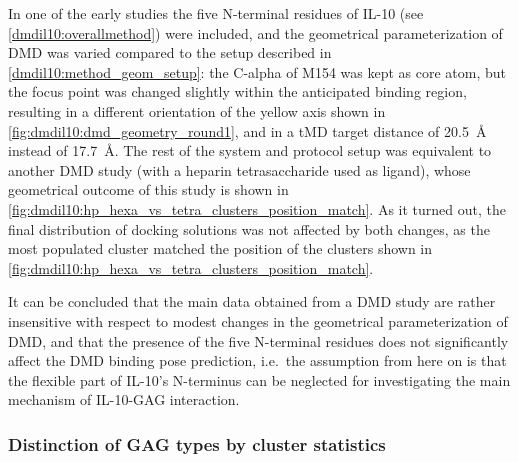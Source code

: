 In one of the early studies the five N-terminal residues of IL-10 (see
\ref{dmdil10:overallmethod}) were included, and the geometrical parameterization
of DMD was varied compared to the setup described in
\ref{dmdil10:method_geom_setup}: the C-alpha of M154 was kept as core atom, but
the focus point was changed slightly within the anticipated binding region,
resulting in a different orientation of the yellow axis shown in
\cref{fig:dmdil10:dmd_geometry_round1}, and in a tMD target distance of
\SI{20.5}{\angstrom} instead of \SI{17.7}{\angstrom}. The rest of the system and
protocol setup was equivalent to another DMD study (with a heparin
tetrasaccharide used as ligand), whose geometrical outcome of this study is
shown in \cref{fig:dmdil10:hp_hexa_vs_tetra_clusters_position_match}. As it
turned out, the final distribution of docking solutions was not affected by both
changes, as the most populated cluster matched the position of the clusters
shown in \cref{fig:dmdil10:hp_hexa_vs_tetra_clusters_position_match}.

It can be concluded that the main data obtained from a DMD study are rather
insensitive with respect to modest changes in the geometrical parameterization
of DMD, and that the presence of the five N-terminal residues does not
significantly affect the DMD binding pose prediction, i.e.\ the assumption from
here on is that the flexible part of IL-10's N-terminus can be neglected for
investigating the main mechanism of IL-10-GAG interaction.


\subsubsection{Distinction of GAG types by cluster statistics}

